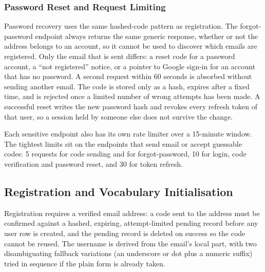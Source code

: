         \subsubsection{Password Reset and Request Limiting}
        \begin{sloppypar}
        Password recovery uses the same hashed-code pattern as registration. The forgot-password endpoint always returns the same generic response, whether or not the address belongs to an account, so it cannot be used to discover which emails are registered. Only the email that is sent differs: a reset code for a password account, a ``not registered'' notice, or a pointer to Google sign-in for an account that has no password. A second request within 60 seconds is absorbed without sending another email. The code is stored only as a hash, expires after a fixed time, and is rejected once a limited number of wrong attempts has been made. A successful reset writes the new password hash and revokes every refresh token of that user, so a session held by someone else does not survive the change.
        \end{sloppypar}

        Each sensitive endpoint also has its own rate limiter over a 15-minute window. The tightest limits sit on the endpoints that send email or accept guessable codes: 5 requests for code sending and for forgot-password, 10 for login, code verification and password reset, and 30 for token refresh.

    \subsection{Registration and Vocabulary Initialisation}
    \label{subsec:registration_impl}
    Registration requires a verified email address: a code sent to the address must be confirmed against a hashed, expiring, attempt-limited pending record before any user row is created, and the pending record is deleted on success so the code cannot be reused. The username is derived from the email's local part, with two disambiguating fallback variations (an underscore or dot plus a numeric suffix) tried in sequence if the plain form is already taken.

